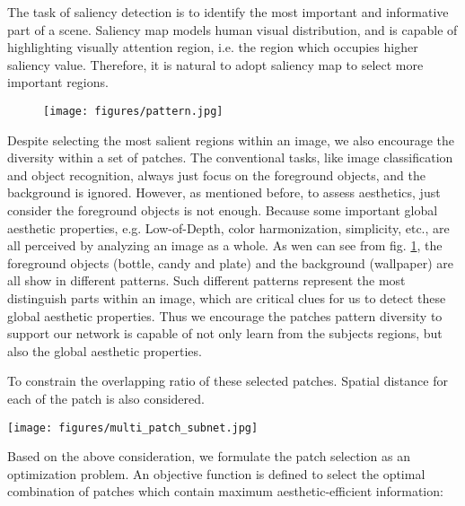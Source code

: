 \documentclass[10pt,twocolumn,letterpaper]{article}
\begin{document}
The task of saliency detection is to identify the most important and informative 
part of a scene. Saliency map models human visual distribution,
and is capable of highlighting visually attention region, i.e. the region which
occupies higher saliency value. Therefore, it is natural to adopt saliency map
to select more important regions.

\begin{figure}
	\centering
	\texttt{[image: figures/pattern.jpg]}
	\label{pattern}
\end{figure}

Despite selecting the most salient regions within an image, we also 
encourage the diversity within a set of patches. 
The conventional tasks, like image classification and object 
recognition, always just focus on the foreground objects, and the background 
is ignored. However, as mentioned before, to assess aesthetics, just consider 
the foreground objects is not enough. Because some important global aesthetic 
properties, e.g. Low-of-Depth, color harmonization, simplicity, etc., 
are all perceived by analyzing an image as a whole. 
As wen can see from fig. \ref{pattern}, the foreground objects 
(bottle, candy and plate) and the background (wallpaper) are all 
show in different patterns. Such different patterns represent the 
most distinguish parts within an image, which are critical clues
for us to detect these global aesthetic properties. Thus we encourage
the patches pattern diversity to support our network is capable of not 
only learn from the subjects regions, but also the global aesthetic properties.

To constrain the overlapping ratio of these selected patches. 
Spatial distance for each of the patch is also considered. 

\begin{figure*}
	\centering
	\texttt{[image: figures/multi\_patch\_subnet.jpg]}
	\label{multi_patch}
\end{figure*}

Based on the above consideration, we formulate the patch selection as an 
optimization problem.  An objective function is defined to select the 
optimal combination of patches which contain maximum aesthetic-efficient 
information:
\end{document}
